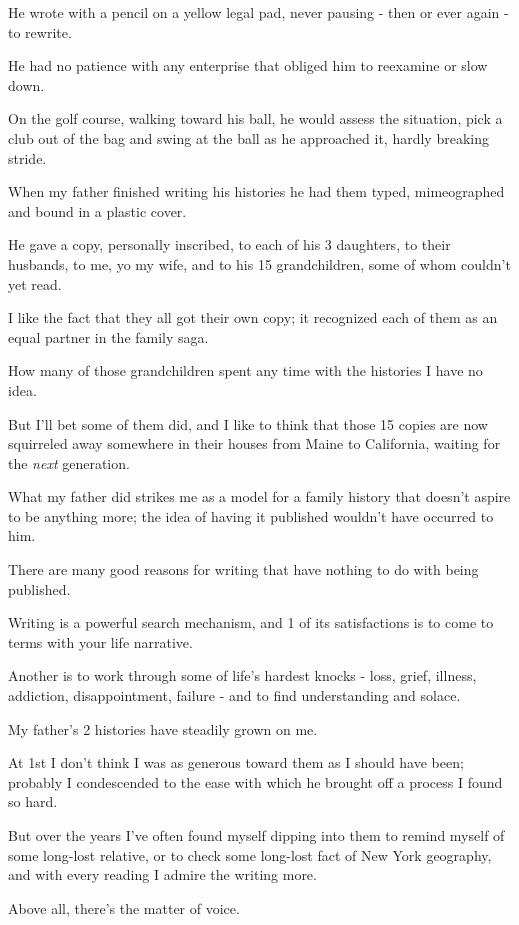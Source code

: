 \documentclass{book}
\numberwithin{equation}{section}
\begin{document}
He wrote with a pencil on a yellow legal pad, never pausing - then or ever again - to rewrite.

He had no patience with any enterprise that obliged him to reexamine or slow down.

On the golf course, walking toward his ball, he would assess the situation, pick a club out of the bag and swing at the ball as he approached it, hardly breaking stride.

%
When my father finished writing his histories he had them typed, mimeographed and bound in a plastic cover.

He gave a copy, personally inscribed, to each of his 3 daughters, to their husbands, to me, yo my wife, and to his 15 grandchildren, some of whom couldn't yet read.

I like the fact that they all got their own copy; it recognized each of them as an equal partner in the family saga.

How many of those grandchildren spent any time with the histories I have no idea.

But I'll bet some of them did, and I like to think that those 15 copies are now squirreled away somewhere in their houses from Maine to California, waiting for the \textit{next} generation.

%
What my father did strikes me as a model for a family history that doesn't aspire to be anything more; the idea of having it published wouldn't have occurred to him.

There are many good reasons for writing that have nothing to do with being published.

Writing is a powerful search mechanism, and 1 of its satisfactions is to come to terms with your life narrative.

Another is to work through some of life's hardest knocks - loss, grief, illness, addiction, disappointment, failure - and to find understanding and solace.

%
My father's 2 histories have steadily grown on me.

At 1st I don't think I was as generous toward them as I should have been; probably I condescended to the ease with which he brought off a process I found so hard.

But over the years I've often found myself dipping into them to remind myself of some long-lost relative, or to check some long-lost fact of New York geography, and with every reading I admire the writing more.

%
Above all, there's the matter of voice.
\end{document}
